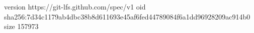 version https://git-lfs.github.com/spec/v1
oid sha256:7d34c1179ab4dbc38b8d611693e45af6fed44789084f6a1dd96928209ac914b0
size 157973
